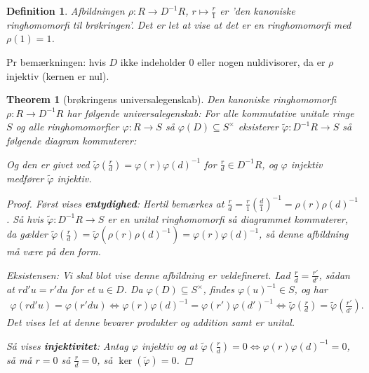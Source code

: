\documentclass[10pt,twoside,openany,final]{memoir}
\theoremstyle{break}
\newtheorem{theorem}[section]{Theorem}
\newtheorem{definition}[section]{Definition}
\theoremstyle{Break}
\begin{document}
\begin{definition}
Afbildningen $\rho \colon R \to D^{-1}R$, $r \mapsto \frac{r}{1}$ er 'den kanoniske ringhomomorfi til brøkringen'. Det er let at vise at det er en ringhomomorfi med $\rho(1)=1$.
\end{definition}
Pr bemærkningen: hvis $D$ ikke indeholder $0$ eller nogen nuldivisorer, da er $\rho$ injektiv (kernen er nul).
\begin{theorem}[brøkringens universalegenskab]
Den kanoniske ringhomomorfi $\rho \colon R \to D^{-1}R$ har følgende universalegenskab: For alle kommutative unitale ringe $S$ og alle ringhomomorfier $\varphi \colon R \to S$ så $\varphi(D) \subseteq S^{\times}$ eksisterer $\tilde{\varphi} \colon D^{-1}R \to S$ så følgende diagram kommuterer:
\begin{center}
\end{center}
Og den er givet ved $\tilde{\varphi}(\frac{r}{d})=\varphi(r)\varphi(d)^{-1}$ for $\frac{r}{d} \in D^{-1}R$, og $\varphi$ injektiv medfører $\tilde{\varphi}$ injektiv.
\begin{proof}
Først vises \textbf{entydighed}: Hertil bemærkes at $\frac{r}{d}=\frac{r}{1}(\frac{d}{1})^{-1}=\rho(r)\rho(d)^{-1}$. Så hvis $\tilde{\varphi} \colon D^{-1}R \to S$ er en unital ringhomomorfi så diagrammet kommuterer, da gælder $\tilde{\varphi}(\frac{r}{d})=\tilde{\varphi}(\rho(r)\rho(d)^{-1})=\varphi(r)\varphi(d)^{-1}$, så denne afbildning må være på den form.

\noindent Eksistensen: Vi skal blot vise denne afbildning er veldefineret. Lad $\frac{r}{d}=\frac{r'}{d'}$, sådan at $rd'u=r'du$ for et $u \in D$. Da $\varphi(D) \subseteq S^{\times}$, findes $\varphi(u)^{-1} \in S$, og har
\begin{align*}
\varphi(rd'u)=\varphi(r'du) \iff \varphi(r)\varphi(d)^{-1} = \varphi(r')\varphi(d')^{-1} \iff \tilde{\varphi}(\frac{r}{d})=\tilde{\varphi}(\frac{r'}{d'}).
\end{align*}
Det vises let at denne bevarer produkter og addition samt er unital. 

Så vises \textbf{injektivitet}: Antag $\varphi$ injektiv og at $\tilde{\varphi}(\frac{r}{d})=0 \iff \varphi(r)\varphi(d)^{-1}=0$, så må $r = 0$ så $\frac{r}{d}=0$, så $\ker(\tilde{\varphi})=0$.
\end{proof}
\end{theorem}
\end{document}
